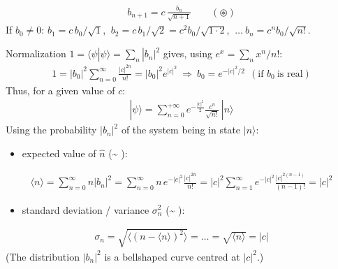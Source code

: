 \documentclass[letterpaper,10pt,english]{jupyterBook}
\begin{document}
\sphinxAtStartPar
{}
\begin{equation*}
\begin{split}
\boxed{b_{n+1}=c\,\frac{b_n}{\sqrt{n+1}}}\qquad(\circledast)
\end{split}
\end{equation*}
\sphinxAtStartPar
If \(b_0\neq0\): \(b_1=c\,b_0/\sqrt1\), \(\ b_2=c\,b_1/\sqrt2=c^2b_0/\sqrt{1\cdot2}\), \(\ \dots\ b_n=c^n b_0/\sqrt{n!}\).

\sphinxAtStartPar
Normalization \(1=\langle\psi|\psi\rangle=\sum_n|b_n|^2\) gives, using \(e^x=\sum_n x^n/n!\):
\begin{equation*}
\begin{split}
1=|b_0|^2\sum_{n=0}^{\infty}\frac{|c|^{2n}}{n!}=|b_0|^2e^{|c|^2}\ \Rightarrow\ b_0=e^{-|c|^2/2}\ \ (\text{if } b_0\ \text{is real})
\end{split}
\end{equation*}
\sphinxAtStartPar
Thus, for a given value of \(c\):
\begin{equation*}
\begin{split}
|\psi\rangle=\sum_{n=0}^{+\infty}e^{-\frac{|c|^2}{2}}\frac{c^n}{\sqrt{n!}}\,|n\rangle
\end{split}
\end{equation*}
\sphinxAtStartPar
{} Using the probability \(|b_n|^2\) of the system being in state \(|n\rangle\):
\begin{itemize}
\item {} 
\sphinxAtStartPar
expected value of \(\hat n\) (\textasciitilde{} ):

\end{itemize}
\begin{equation*}
\begin{split}
\langle n\rangle=\sum_{n=0}^{\infty}n|b_n|^2=\sum_{n=0}^{\infty}n\,e^{-|c|^2}\frac{|c|^{2n}}{n!}
=|c|^2\sum_{n=1}^{\infty}e^{-|c|^2}\frac{|c|^{2(n-1)}}{(n-1)!}=|c|^2
\end{split}
\end{equation*}\begin{itemize}
\item {} 
\sphinxAtStartPar
standard deviation / variance \(\sigma_n^2\) (\textasciitilde{} ):

\end{itemize}
\begin{equation*}
\begin{split}
\sigma_n=\sqrt{\langle(n-\langle n\rangle)^2\rangle}=\dots=\sqrt{\langle n\rangle}=|c|
\end{split}
\end{equation*}
\sphinxAtStartPar
(The distribution \(|b_n|^2\) is a bell\sphinxhyphen{}shaped curve centred at \(|c|^2\).)
\end{document}
